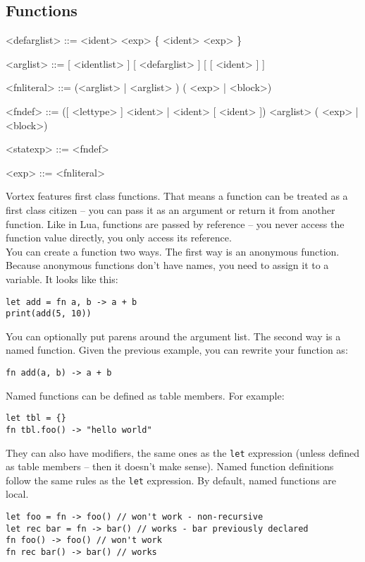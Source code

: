 \documentclass{article}
\newenvironment{bnf}
{
\begin{mdframed}
\begin{grammar}
}
{
\end{grammar}
\end{mdframed}
}
\begin{document}
\subsection{Functions}
\begin{bnf}
<defarglist> ::= <ident> \lit{=} <exp> \{ \lit{,} <ident> \lit{=} <exp> \}

<arglist> ::= [ <identlist> ] [ <defarglist> ] [ [ <ident> ]  ]

<fnliteral> ::=  (<arglist> | \lit{(} <arglist> \lit{)})
    (\lit{->} <exp> | <block>)

<fndef> ::=  ([ <lettype> ] <ident> | <ident> [  <ident> ])
    \lit{(} <arglist> \lit{)} (\lit{->} <exp> | <block>)

<statexp> ::= <fndef>

<exp> ::= <fnliteral>
\end{bnf}
Vortex features first class functions. That means a function can be treated
as a first class citizen -- you can pass it as an argument or return it from
another function. Like in Lua, functions are passed by reference -- you never
access the function value directly, you only access its reference.\\
You can create a function two ways. The first way is an anonymous function.
Because anonymous functions don't have names, you need to assign it to a
variable. It looks like this:
\begin{lstlisting}[language=vortex]
let add = fn a, b -> a + b
print(add(5, 10))
\end{lstlisting}
You can optionally put parens around the argument list. The second way is
a named function. Given the previous example, you can rewrite your function
as:
\begin{lstlisting}[language=vortex]
fn add(a, b) -> a + b
\end{lstlisting}
Named functions can be defined as table members. For example:
\begin{lstlisting}[language=vortex]
let tbl = {}
fn tbl.foo() -> "hello world"
\end{lstlisting}
They can also have modifiers, the same ones as the \verb|let| expression
(unless defined as table members -- then it doesn't make sense). Named
function definitions follow the same rules as the \verb|let| expression.
By default, named functions are local.
\begin{lstlisting}[language=vortex]
let foo = fn -> foo() // won't work - non-recursive
let rec bar = fn -> bar() // works - bar previously declared
fn foo() -> foo() // won't work
fn rec bar() -> bar() // works
\end{lstlisting}
\end{document}
